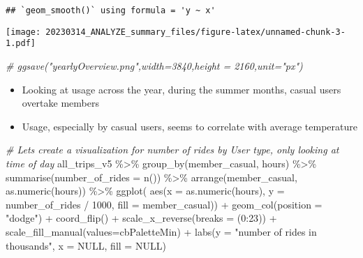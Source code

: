 \documentclass[
]{article}
\newenvironment{Shaded}{\begin{snugshade}}{\end{snugshade}}
\newcommand{\AttributeTok}[1]{\textcolor[rgb]{0.77,0.63,0.00}{#1}}
\newcommand{\CommentTok}[1]{\textcolor[rgb]{0.56,0.35,0.01}{\textit{#1}}}
\newcommand{\ConstantTok}[1]{\textcolor[rgb]{0.00,0.00,0.00}{#1}}
\newcommand{\DecValTok}[1]{\textcolor[rgb]{0.00,0.00,0.81}{#1}}
\newcommand{\FunctionTok}[1]{\textcolor[rgb]{0.00,0.00,0.00}{#1}}
\newcommand{\NormalTok}[1]{#1}
\newcommand{\SpecialCharTok}[1]{\textcolor[rgb]{0.00,0.00,0.00}{#1}}
\newcommand{\StringTok}[1]{\textcolor[rgb]{0.31,0.60,0.02}{#1}}
\providecommand{\tightlist}{%
  \setlength{\itemsep}{0pt}\setlength{\parskip}{0pt}}
\begin{document}
\begin{verbatim}
## `geom_smooth()` using formula = 'y ~ x'
\end{verbatim}

\texttt{[image: 20230314\_ANALYZE\_summary\_files/figure-latex/unnamed-chunk-3-1.pdf]}

\begin{Shaded}
\begin{Highlighting}[]
\CommentTok{\# ggsave("yearlyOverview.png",width=3840,height = 2160,unit="px")}
\end{Highlighting}
\end{Shaded}

\fontsize{10}{12}
\selectfont

\begin{itemize}
\tightlist
\item
  Looking at usage across the year, during the summer months, casual
  users overtake members
\item
  Usage, especially by casual users, seems to correlate with average
  temperature
\end{itemize}

\fontsize{9}{11}
\selectfont

\begin{Shaded}
\begin{Highlighting}[]
\CommentTok{\# Let\textquotesingle{}s create a visualization for number of rides by User type, only looking at time of day}
\NormalTok{all\_trips\_v5 }\SpecialCharTok{\%\textgreater{}\%} 
  \FunctionTok{group\_by}\NormalTok{(member\_casual, hours) }\SpecialCharTok{\%\textgreater{}\%} 
  \FunctionTok{summarise}\NormalTok{(}\AttributeTok{number\_of\_rides =} \FunctionTok{n}\NormalTok{()) }\SpecialCharTok{\%\textgreater{}\%} 
  \FunctionTok{arrange}\NormalTok{(member\_casual, }\FunctionTok{as.numeric}\NormalTok{(hours))  }\SpecialCharTok{\%\textgreater{}\%} 
  \FunctionTok{ggplot}\NormalTok{( }\FunctionTok{aes}\NormalTok{(}\AttributeTok{x =} \FunctionTok{as.numeric}\NormalTok{(hours), }\AttributeTok{y =}\NormalTok{ number\_of\_rides }\SpecialCharTok{/} \DecValTok{1000}\NormalTok{, }\AttributeTok{fill =}\NormalTok{ member\_casual)) }\SpecialCharTok{+}
  \FunctionTok{geom\_col}\NormalTok{(}\AttributeTok{position =} \StringTok{"dodge"}\NormalTok{) }\SpecialCharTok{+} 
  \FunctionTok{coord\_flip}\NormalTok{()  }\SpecialCharTok{+}
  \FunctionTok{scale\_x\_reverse}\NormalTok{(}\AttributeTok{breaks =}\NormalTok{ (}\DecValTok{0}\SpecialCharTok{:}\DecValTok{23}\NormalTok{)) }\SpecialCharTok{+}
  \FunctionTok{scale\_fill\_manual}\NormalTok{(}\AttributeTok{values=}\NormalTok{cbPaletteMin) }\SpecialCharTok{+}
  \FunctionTok{labs}\NormalTok{(}\AttributeTok{y =} \StringTok{"number of rides in thousands"}\NormalTok{, }\AttributeTok{x =} \ConstantTok{NULL}\NormalTok{, }\AttributeTok{fill =} \ConstantTok{NULL}\NormalTok{)}
\end{Highlighting}
\end{Shaded}
\end{document}
